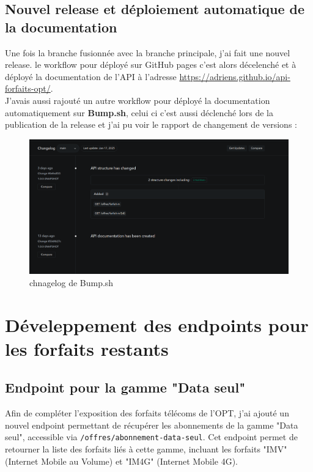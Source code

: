 \documentclass[11pt]{article}
\begin{document}
		\subsection*{Nouvel release et déploiement automatique de la documentation}
		
		Une fois la branche fusionnée avec la branche principale, j'ai fait une nouvel release. le workflow pour déployé sur GitHub pages c'est alors décelenché et à déployé la documentation de l'API à l'adresse \url{https://adriens.github.io/api-forfaits-opt/}.\\
		J'avais aussi rajouté un autre workflow pour déployé la documentation  automatiquement sur \textbf{Bump.sh}, celui ci c'est aussi déclenché lors de la publication de la release et j'ai pu voir le rapport de changement de versions : 
		
		\begin{figure}[H] \centering \includegraphics[width=\textwidth]{asset/changelog.png} \caption{chnagelog de Bump.sh} \label{fig:sonarq}\end{figure}
		\section{Déveleppement des endpoints pour les forfaits restants}
		\subsection*{Endpoint pour la gamme "Data seul"}
		
		Afin de compléter l'exposition des forfaits télécoms de l'OPT, j'ai ajouté un nouvel endpoint permettant de récupérer les abonnements de la gamme "Data seul", accessible via \texttt{/offres/abonnement-data-seul}. Cet endpoint permet de retourner la liste des forfaits liés à cette gamme, incluant les forfaits "IMV" (Internet Mobile au Volume) et "IM4G" (Internet Mobile 4G).
		
\end{document}
